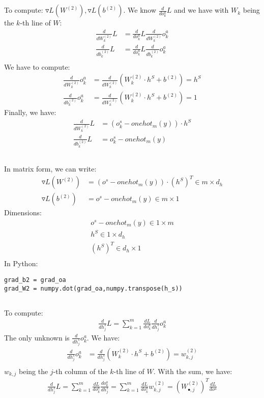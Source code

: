 \documentclass[12pt]{article}
\begin{document}
\subsection{}
To compute: $\triangledown L(W^{(2)}), \triangledown L(b^{(2)})$.
We know $\frac{d}{do^a_k} L$ and we have with $W_k$ being the $k$-th line of $W$:
\begin{align*}
\frac{d}{dW^{(2)}_{k}} L &= \frac{d}{do^a_k} L \frac{d}{dW^{(2)}_{k}} o^a_k \\
\frac{d}{db^{(2)}_{k}} L &= \frac{d}{do^a_k} L \frac{d}{db^{(2)}_{k}} o^a_k \\
\end{align*}
We have to compute:
\begin{align*}
\frac{d}{dW^{(2)}_{k}} o^a_k & = \frac{d}{dW^{(2)}_{k}} (W^{(2)}_{k} \cdot h^S + b^{(2)}) = h^S \\
\frac{d}{db^{(2)}_{k}} o^a_k &= \frac{d}{dW^{(2)}_{k}} (W^{(2)}_{k} \cdot h^S + b^{(2)}) = 1
\end{align*}
Finally, we have:
\begin{align*}
\frac{d}{dW^{(2)}_{k}} L & = (o^s_k-onehot_m(y)) \cdot h^S \\
\frac{d}{db^{(2)}_{k}} L & = o^s_k-onehot_m(y)
\end{align*}
\subsection{}
In matrix form, we can write:
\begin{align*}
\triangledown L(W^{(2)}) & = (o^s-onehot_m(y)) \cdot (h^S)^T \in m \times d_h \\
\triangledown L(b^{(2)}) & = o^s-onehot_m(y) \in m \times 1
\end{align*}
Dimensions: \begin{align*}
o^s-onehot_m(y) \in 1 \times m \\
h^S \in 1 \times d_h \\
(h^S)^T \in d_h \times 1 \\
\end{align*}
In Python:
\begin{lstlisting}
grad_b2 = grad_oa
grad_W2 = numpy.dot(grad_oa,numpy.transpose(h_s))
\end{lstlisting}
\subsection{}
To compute: 
\begin{align*}
\frac{d}{dh^s_j}L = \sum\limits_{k=1}^m \frac{dL}{do_k^a} \frac{d}{dh_j^s}o_k^a
\end{align*}
The only unknown is $\frac{d}{dh_j^s}o_k^a$. We have:
\begin{align*}
\frac{d}{dh^s_j} {o^a_k} &= \frac{d}{dh^s_j} (W^{(2)}_{k} \cdot h^S + b^{(2)}) = w^{(2)}_{k,j} \\
\end{align*}
$w_{k,j}$ being the $j$-th column of the $k$-th line of $W$. With the sum, we have:
\begin{align*}
\frac{d}{dh^s_j}L = \sum\limits_{k=1}^m \frac{dL}{do^a_k} \frac{d{o^a_k}}{dh^s_j} = 
\sum\limits_{k=1}^m \frac{dL}{do^a_k}  w^{(2)}_{k,j}=(W^{(2)}_{\bullet,j})^T \frac{dL}{do^a} 
\end{align*}
\end{document}
